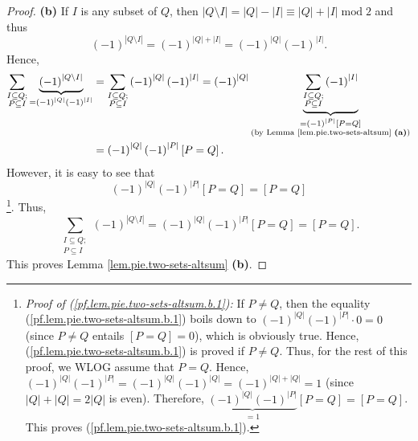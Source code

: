 \begin{proof}
\textbf{(b)} If $I$ is any subset of $Q$, then $\left\vert Q\setminus
I\right\vert =\left\vert Q\right\vert -\left\vert I\right\vert \equiv
\left\vert Q\right\vert +\left\vert I\right\vert \operatorname{mod}2$ and thus%
\[
\left(  -1\right)  ^{\left\vert Q\setminus I\right\vert }=\left(  -1\right)
^{\left\vert Q\right\vert +\left\vert I\right\vert }=\left(  -1\right)
^{\left\vert Q\right\vert }\left(  -1\right)  ^{\left\vert I\right\vert }.
\]
Hence,%
\begin{align*}
\sum_{\substack{I\subseteq Q;\\P\subseteq I}}\underbrace{\left(  -1\right)
^{\left\vert Q\setminus I\right\vert }}_{=\left(  -1\right)  ^{\left\vert
Q\right\vert }\left(  -1\right)  ^{\left\vert I\right\vert }}  &
=\sum_{\substack{I\subseteq Q;\\P\subseteq I}}\left(  -1\right)  ^{\left\vert
Q\right\vert }\left(  -1\right)  ^{\left\vert I\right\vert }=\left(
-1\right)  ^{\left\vert Q\right\vert }\underbrace{\sum_{\substack{I\subseteq
Q;\\P\subseteq I}}\left(  -1\right)  ^{\left\vert I\right\vert }%
}_{\substack{=\left(  -1\right)  ^{\left\vert P\right\vert }\left[
P=Q\right]  \\\text{(by Lemma \ref{lem.pie.two-sets-altsum} \textbf{(a)})}}}\\
&  =\left(  -1\right)  ^{\left\vert Q\right\vert }\left(  -1\right)
^{\left\vert P\right\vert }\left[  P=Q\right]  .
\end{align*}
However, it is easy to see that%
\begin{equation}
\left(  -1\right)  ^{\left\vert Q\right\vert }\left(  -1\right)  ^{\left\vert
P\right\vert }\left[  P=Q\right]  =\left[  P=Q\right]
\label{pf.lem.pie.two-sets-altsum.b.1}%
\end{equation}
\footnote{\textit{Proof of (\ref{pf.lem.pie.two-sets-altsum.b.1}):} If $P\neq
Q$, then the equality (\ref{pf.lem.pie.two-sets-altsum.b.1}) boils down to
$\left(  -1\right)  ^{\left\vert Q\right\vert }\left(  -1\right)  ^{\left\vert
P\right\vert }\cdot0=0$ (since $P\neq Q$ entails $\left[  P=Q\right]  =0$),
which is obviously true. Hence, (\ref{pf.lem.pie.two-sets-altsum.b.1}) is
proved if $P\neq Q$. Thus, for the rest of this proof, we WLOG assume that
$P=Q$. Hence, $\left(  -1\right)  ^{\left\vert Q\right\vert }\left(
-1\right)  ^{\left\vert P\right\vert }=\left(  -1\right)  ^{\left\vert
Q\right\vert }\left(  -1\right)  ^{\left\vert Q\right\vert }=\left(
-1\right)  ^{\left\vert Q\right\vert +\left\vert Q\right\vert }=1$ (since
$\left\vert Q\right\vert +\left\vert Q\right\vert =2\left\vert Q\right\vert $
is even). Therefore, $\underbrace{\left(  -1\right)  ^{\left\vert Q\right\vert
}\left(  -1\right)  ^{\left\vert P\right\vert }}_{=1}\left[  P=Q\right]
=\left[  P=Q\right]  $. This proves (\ref{pf.lem.pie.two-sets-altsum.b.1}).}.
Thus,%
\[
\sum_{\substack{I\subseteq Q;\\P\subseteq I}}\left(  -1\right)  ^{\left\vert
Q\setminus I\right\vert }=\left(  -1\right)  ^{\left\vert Q\right\vert
}\left(  -1\right)  ^{\left\vert P\right\vert }\left[  P=Q\right]  =\left[
P=Q\right]  .
\]
This proves Lemma \ref{lem.pie.two-sets-altsum} \textbf{(b)}.
\end{proof}

